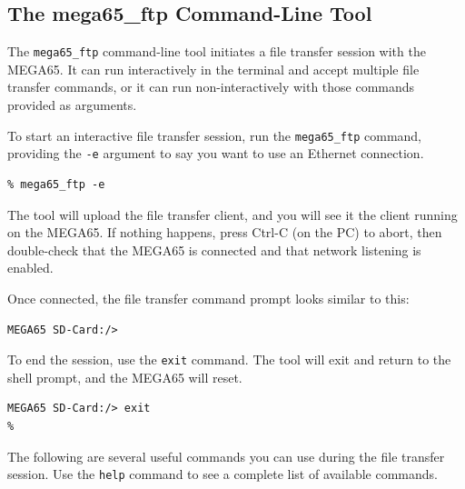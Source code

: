\subsection{The mega65\_ftp Command-Line Tool}

The {\tt mega65\_ftp} command-line tool initiates a file transfer session with the MEGA65. It can run interactively in the terminal and accept multiple file transfer commands, or it can run non-interactively with those commands provided as arguments.

To start an interactive file transfer session, run the {\tt mega65\_ftp} command, providing the {\tt -e} argument to say you want to use an Ethernet connection.

\begin{verbatim}
% mega65_ftp -e
\end{verbatim}

The tool will upload the file transfer client, and you will see it the client running on the MEGA65. If nothing happens, press Ctrl-C (on the PC) to abort, then double-check that the MEGA65 is connected and that network listening is enabled.

Once connected, the file transfer command prompt looks similar to this:

\begin{verbatim}
MEGA65 SD-Card:/>
\end{verbatim}

To end the session, use the {\tt exit} command. The tool will exit and return to the shell prompt, and the MEGA65 will reset.

\begin{verbatim}
MEGA65 SD-Card:/> exit
%
\end{verbatim}

The following are several useful commands you can use during the file transfer session. Use the {\tt help} command to see a complete list of available commands.

